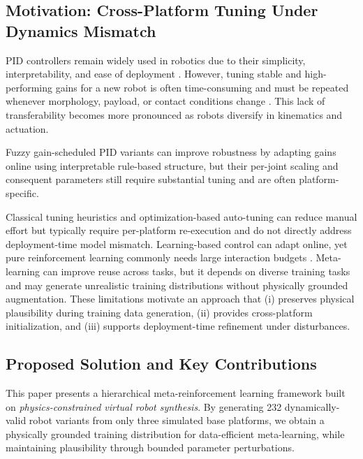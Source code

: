 \documentclass[DTMColor]{ROB-New}
\begin{document}
\subsection{Motivation: Cross-Platform Tuning Under Dynamics Mismatch}

PID controllers remain widely used in robotics due to their simplicity, interpretability, and ease of deployment \cite{astrom2006advanced}. However, tuning stable and high-performing gains for a new robot is often time-consuming and must be repeated whenever morphology, payload, or contact conditions change \cite{vilanova2012pid,johnson2021industrial}. This lack of transferability becomes more pronounced as robots diversify in kinematics and actuation.

Fuzzy gain-scheduled PID variants can improve robustness by adapting gains online using interpretable rule-based structure, but their per-joint scaling and consequent parameters still require substantial tuning and are often platform-specific.

Classical tuning heuristics and optimization-based auto-tuning \cite{gaing2004particle,berkenkamp2016safe} can reduce manual effort but typically require per-platform re-execution and do not directly address deployment-time model mismatch. Learning-based control can adapt online, yet pure reinforcement learning commonly needs large interaction budgets \cite{lillicrap2015continuous}. Meta-learning can improve reuse across tasks, but it depends on diverse training tasks and may generate unrealistic training distributions without physically grounded augmentation. These limitations motivate an approach that (i) preserves physical plausibility during training data generation, (ii) provides cross-platform initialization, and (iii) supports deployment-time refinement under disturbances.

\subsection{Proposed Solution and Key Contributions}

This paper presents a hierarchical meta-reinforcement learning framework built on \textit{physics-constrained virtual robot synthesis}. By generating 232 dynamically-valid robot variants from only three simulated base platforms, we obtain a physically grounded training distribution for data-efficient meta-learning, while maintaining plausibility through bounded parameter perturbations.
\end{document}
